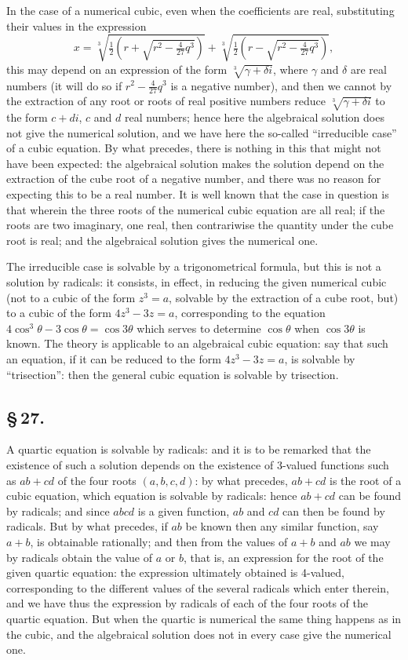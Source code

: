 \documentclass[11pt,a4paper]{article}
\begin{document}
In the case of a numerical cubic, even when the coefficients are real, substituting their values in the expression
\[
x = \sqrt[3]{\tfrac{1}{2}(r + \sqrt{r^{2} - \tfrac{4}{27}q^{3}})} + \sqrt[3]{\tfrac{1}{2}(r - \sqrt{r^{2} - \tfrac{4}{27}q^{3}})},
\]
this may depend on an expression of the form $\sqrt[3]{\gamma + \delta i}$, where $\gamma$ and $\delta$ are real numbers (it will do so if $r^{2} - \frac{4}{27}q^{3}$ is a negative number), and then we cannot by the extraction of any root or roots of real positive numbers reduce $\sqrt[3]{\gamma + \delta i}$ to the form $c + di$, $c$ and $d$ real numbers; hence here the algebraical solution does not give the numerical solution, and we have here the so-called ``irreducible case'' of a cubic equation. By what precedes, there is nothing in this that might not have been expected: the algebraical solution makes the solution depend on the extraction of the cube root of a negative number, and there was no reason for expecting this to be a real number. It is well known that the case in question is that wherein the three roots of the numerical cubic equation are all real; if the roots are two imaginary, one real, then contrariwise the quantity under the cube root is real; and the algebraical solution gives the numerical one.

The irreducible case is solvable by a trigonometrical formula, but this is not a solution by radicals: it consists, in effect, in reducing the given numerical cubic (not to a cubic of the form $z^{3} = a$, solvable by the extraction of a cube root, but) to a cubic of the form $4z^{3} - 3z = a$, corresponding to the equation $4\cos^{3}\theta - 3\cos\theta = \cos 3\theta$ which serves to determine $\cos\theta$ when $\cos 3\theta$ is known. The theory is applicable to an algebraical cubic equation: say that such an equation, if it can be reduced to the form $4z^{3} - 3z = a$, is solvable by ``trisection'': then the general cubic equation is solvable by trisection.

\subsection*{\S\,27.}

A quartic equation is solvable by radicals: and it is to be remarked that the existence of such a solution depends on the existence of 3-valued functions such as $ab + cd$ of the four roots $(a, b, c, d)$: by what precedes, $ab + cd$ is the root of a cubic equation, which equation is solvable by radicals: hence $ab + cd$ can be found by radicals; and since $abcd$ is a given function, $ab$ and $cd$ can then be found by radicals. But by what precedes, if $ab$ be known then any similar function, say $a + b$, is obtainable rationally; and then from the values of $a + b$ and $ab$ we may by radicals obtain the value of $a$ or $b$, that is, an expression for the root of the given quartic equation: the expression ultimately obtained is 4-valued, corresponding to the different values of the several radicals which enter therein, and we have thus the expression by radicals of each of the four roots of the quartic equation. But when the quartic is numerical the same thing happens as in the cubic, and the algebraical solution does not in every case give the numerical one.
\end{document}
